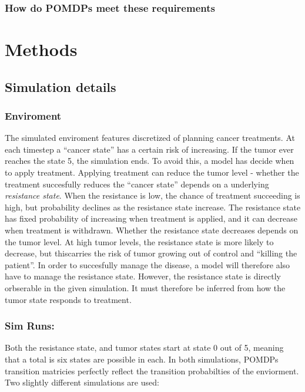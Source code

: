 \documentclass[notspecified,article,submit,moreauthors,pdftex]{Definitions/mdpi}
\begin{document}
\subsubsection{How do POMDPs meet these
requirements}\label{how-do-pomdps-meet-these-requirements}

\section{Methods}\label{methods}

\subsection{Simulation details}\label{simulation-details}

\subsubsection{Enviroment}\label{enviroment}

The simulated enviroment features discretized of planning cancer
treatments. At each timestep a ``cancer state'' has a certain risk of
increasing. If the tumor ever reaches the state 5, the simulation ends.
To avoid this, a model has decide when to apply treatment. Applying
treatment can reduce the tumor level - whether the treatment succesfully
reduces the ``cancer state'' depends on a underlying \emph{resistance
state}. When the resistance is low, the chance of treatment succeeding
is high, but probability declines as the resistance state increase. The
resistance state has fixed probability of increasing when treatment is
applied, and it can decrease when treatment is withdrawn. Whether the
resistance state decreases depends on the tumor level. At high tumor
levels, the resistance state is more likely to decrease, but thiscarries
the risk of tumor growing out of control and ``killing the patient''. In
order to succesfully manage the disease, a model will therefore also
have to manage the resistance state. However, the resistance state is
directly orbserable in the given simulation. It must therefore be
inferred from how the tumor state responds to treatment.

\subsubsection{Sim Runs:}\label{sim-runs}

Both the resistance state, and tumor states start at state 0 out of 5,
meaning that a total is six states are possible in each. In both
simulations, POMDPs transition matricies perfectly reflect the
transition probabilties of the enviorment. Two slightly different
simulations are used:
\end{document}
